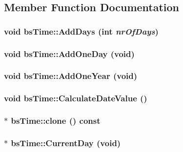 \subsection{Member Function Documentation}
\hypertarget{classbs_time_a251f783d4c967ab24b9509e7f46f4785}{
\subsubsection[{AddDays}]{\setlength{\rightskip}{0pt plus 5cm}void bsTime::AddDays (int {\em nrOfDays})}}
\label{classbs_time_a251f783d4c967ab24b9509e7f46f4785}
\hypertarget{classbs_time_a0386f6d4b49e3c0fd6f04f523dbfc7af}{
\subsubsection[{AddOneDay}]{\setlength{\rightskip}{0pt plus 5cm}void bsTime::AddOneDay (void)}}
\label{classbs_time_a0386f6d4b49e3c0fd6f04f523dbfc7af}
\hypertarget{classbs_time_a45d7d97a8d867fe01e85db355a8f9a89}{
\subsubsection[{AddOneYear}]{\setlength{\rightskip}{0pt plus 5cm}void bsTime::AddOneYear (void)}}
\label{classbs_time_a45d7d97a8d867fe01e85db355a8f9a89}
\hypertarget{classbs_time_a790ba0e1a0b3ccf70e2fee6041909498}{
\subsubsection[{CalculateDateValue}]{\setlength{\rightskip}{0pt plus 5cm}void bsTime::CalculateDateValue ()}}
\label{classbs_time_a790ba0e1a0b3ccf70e2fee6041909498}
\hypertarget{classbs_time_a36b213ecefd6c4e7a51eac4c27483270}{
\subsubsection[{clone}]{ $\ast$ bsTime::clone () const}}
\label{classbs_time_a36b213ecefd6c4e7a51eac4c27483270}
\hypertarget{classbs_time_a1631d6b4f0748b820f09bdef6f273d1e}{
\subsubsection[{CurrentDay}]{$\ast$ bsTime::CurrentDay (void)}}
